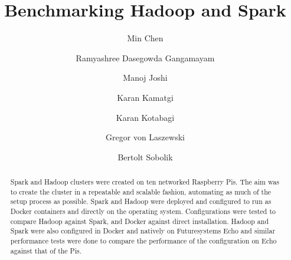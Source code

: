 \title{Benchmarking Hadoop and Spark}


\author{Min Chen}

\author{Ramyashree Dasegowda Gangamayam}

\author{Manoj Joshi}

\author{Karan Kamatgi}

\author{Karan Kotabagi}

\author{Gregor von Laszewski}

\author{Bertolt Sobolik}


\renewcommand{\shortauthors}{M. Chen, R. Dasedowda  Gangamayan, K. Kamatgi,
K. Kotabagi, G. v. Laszewski, B. Sobolik}


\begin{abstract}
Spark and Hadoop clusters were created on ten networked Raspberry
Pis. The aim was to create the cluster in a repeatable and scalable
fashion, automating as much of the setup process as possible. Spark
and Hadoop were deployed and configured to run as Docker containers
and directly on the operating system. Configurations were tested to
compare Hadoop against Spark, and Docker against direct
installation. Hadoop and Spark were also configured in Docker and
natively on Futuresystems Echo and similar performance tests were done
to compare the performance of the configuration on Echo against that
of the Pis.
\end{abstract}

